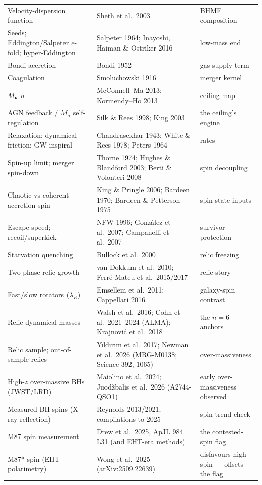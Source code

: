 \documentclass[11pt]{article}
\begin{document}
\begin{small}
\begin{longtable}{p{}p{}p{}}
Velocity-dispersion function & Sheth et al.\ 2003 & BHMF composition\\
Seeds; Eddington/Salpeter $e$-fold; hyper-Eddington & Salpeter 1964; Inayoshi, Haiman \& Ostriker 2016 & low-mass end\\
Bondi accretion & Bondi 1952 & gas-supply term\\
Coagulation & Smoluchowski 1916 & merger kernel\\
$M_\bullet$--$\sigma$ & McConnell--Ma 2013; Kormendy--Ho 2013 & ceiling map\\
AGN feedback / $M_\sigma$ self-regulation & Silk \& Rees 1998; King 2003 & the ceiling's engine\\
Relaxation; dynamical friction; GW inspiral & Chandrasekhar 1943; White \& Rees 1978; Peters 1964 & rates\\
Spin-up limit; merger spin-down & Thorne 1974; Hughes \& Blandford 2003; Berti \& Volonteri 2008 & spin decoupling\\
Chaotic vs coherent accretion spin & King \& Pringle 2006; Bardeen 1970; Bardeen \& Petterson 1975 & spin-state inputs\\
Escape speed; recoil/superkick & NFW 1996; Gonz\'alez et al.\ 2007; Campanelli et al.\ 2007 & survivor protection\\
Starvation quenching & Bullock et al.\ 2000 & relic freezing\\
Two-phase relic growth & van Dokkum et al.\ 2010; Ferr\'e-Mateu et al.\ 2015/2017 & relic story\\
Fast/slow rotators ($\lambda_R$) & Emsellem et al.\ 2011; Cappellari 2016 & galaxy-spin contrast\\
Relic dynamical masses & Walsh et al.\ 2016; Cohn et al.\ 2021--2024 (ALMA); Krajnovi\'c et al.\ 2018 & the $n=6$ anchors\\
Relic sample; out-of-sample relics & Y{\i}ld{\i}r{\i}m et al.\ 2017; Newman et al.\ 2026 (MRG-M0138; Science 392, 1065) & over-massiveness\\
High-$z$ over-massive BHs (JWST/LRD) & Maiolino et al.\ 2024; Juod\v{z}balis et al.\ 2026 (A2744-QSO1) & early over-massiveness observed\\
Measured BH spins (X-ray reflection) & Reynolds 2013/2021; compilations to 2025 & spin-trend check\\
M87 spin measurement & Drew et al.\ 2025, ApJL 984 L31 (and EHT-era methods) & the contested-spin flag\\
M87* spin (EHT polarimetry) & Wong et al.\ 2025 (arXiv:2509.22639) & disfavours high spin --- offsets the flag\\

\end{longtable}
\end{small}
\end{document}

